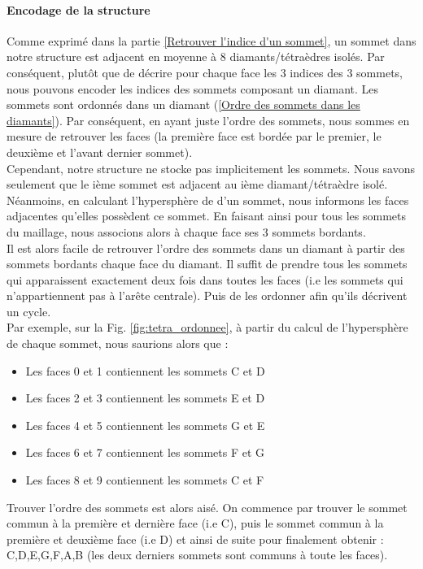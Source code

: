 \documentclass[a4paper,11pt,openany]{article}
\begin{document}
\paragraph{Encodage de la structure}
Comme exprimé dans la partie \ref{Retrouver l'indice d'un sommet}, un sommet dans notre structure est adjacent en moyenne à 8 diamants/tétraèdres isolés. Par conséquent, plutôt que de décrire pour chaque face les 3 indices des 3 sommets, nous pouvons encoder les indices des sommets composant un diamant. Les sommets sont ordonnés dans un diamant (\ref{Ordre des sommets dans les diamants}). Par conséquent, en ayant juste l'ordre des sommets, nous sommes en mesure de retrouver les faces (la première face est bordée par le premier, le deuxième et l'avant dernier sommet).\\
Cependant, notre structure ne stocke pas implicitement les sommets. Nous savons seulement que le ième sommet est adjacent au ième diamant/tétraèdre isolé. Néanmoins, en calculant l'hypersphère de d'un sommet, nous informons les faces adjacentes qu'elles possèdent ce sommet. En faisant ainsi pour tous les sommets du maillage, nous associons alors à chaque face ses 3 sommets bordants.\\
Il est alors facile de retrouver l'ordre des sommets dans un diamant à partir des sommets bordants chaque face du diamant. Il suffit de prendre tous les sommets qui apparaissent exactement deux fois dans toutes les faces (i.e les sommets qui n'appartiennent pas à l'arête centrale). Puis de les ordonner afin qu'ils décrivent un cycle.\\
Par exemple, sur la Fig. \ref{fig:tetra_ordonnee}, à partir du calcul de l'hypersphère de chaque sommet, nous saurions alors que :
\begin{itemize}
\item Les faces 0 et 1 contiennent les sommets C et D
\item Les faces 2 et 3 contiennent les sommets E et D
\item Les faces 4 et 5 contiennent les sommets G et E
\item Les faces 6 et 7 contiennent les sommets F et G
\item Les faces 8 et 9 contiennent les sommets C et F
\end{itemize}
Trouver l'ordre des sommets est alors aisé. On commence par trouver le sommet commun à la première et dernière face (i.e C), puis le sommet commun à la première et deuxième face (i.e D) et ainsi de suite pour finalement obtenir : C,D,E,G,F,A,B (les deux derniers sommets sont communs à toute les faces).
\end{document}
